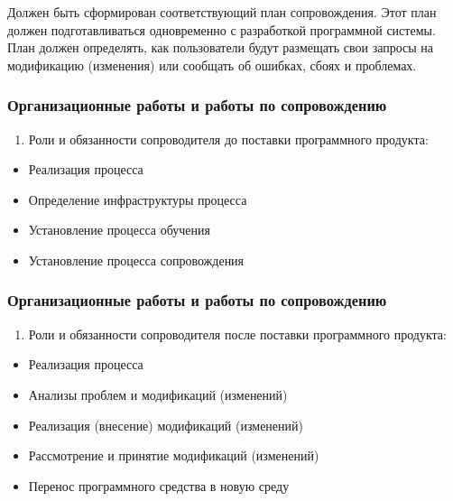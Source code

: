 \documentclass{../industrial-development}
\begin{document}
\lecturenotes
Должен быть сформирован соответствующий план сопровождения. Этот план должен подготавливаться одновременно с разработкой программной системы. План должен определять, как пользователи будут размещать свои запросы на модификацию (изменения) или сообщать об ошибках, сбоях и проблемах. 



\begin{frame} \frametitle{Организационные работы и работы по сопровождению}
	\begin{enumerate}[1] \item Роли и обязанности сопроводителя до поставки программного продукта:\end{enumerate}
	\begin{itemize}
	\item Реализация процесса 
	\item Определение инфраструктуры процесса 
	\item Установление процесса обучения 
	\item Установление процесса сопровождения 
	\end{itemize}
\end{frame}

\lecturenotes

\begin{frame} \frametitle{Организационные работы и работы по сопровождению}
	\begin{enumerate}[2] \item Роли и обязанности сопроводителя после поставки программного продукта:  \end{enumerate}
	\begin{itemize}
		\item Реализация процесса
		\item Анализы проблем и модификаций (изменений)  
		\item Реализация (внесение) модификаций (изменений) 
		\item Рассмотрение и принятие модификаций (изменений) 
		\item Перенос программного средства в новую среду
	\end{itemize}
\end{frame}

\lecturenotes
\end{document}
